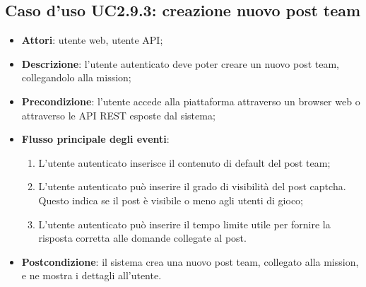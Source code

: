 \subsection{Caso d'uso UC2.9.3: creazione nuovo post team}
\begin{itemize}
\item \textbf{Attori}: utente web, utente API;
\item \textbf{Descrizione}: l'utente autenticato deve poter creare un nuovo post team, collegandolo alla mission; 
      \item \textbf{Precondizione}: l'utente accede alla piattaforma attraverso un browser web o attraverso le API REST esposte dal sistema;

        \item \textbf{Flusso principale degli eventi}:
          \begin{enumerate}
          \item L'utente autenticato inserisce il contenuto di default del post team;
          \item L'utente autenticato può inserire il grado di visibilità del post captcha. Questo indica se il post è visibile o meno agli utenti di gioco;
          \item L'utente autenticato può inserire il tempo limite utile per fornire la risposta corretta alle domande collegate al post.

      \end{enumerate}
    \item \textbf{Postcondizione}: il sistema crea una nuovo post team, collegato alla mission, e ne mostra i dettagli all'utente.
  \end{itemize}
\hypertarget{UC2.9.4}{}
